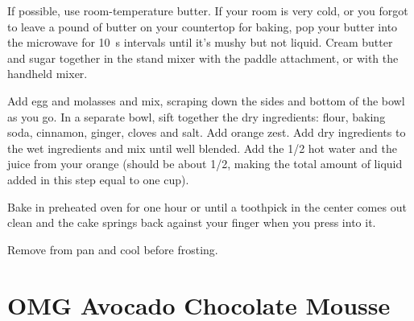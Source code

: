 If possible, use room-temperature butter. If your room is very cold, or you
forgot to leave a pound of butter on your countertop for baking, pop your butter
into the microwave for \SI{10}{\second} intervals until it's mushy but not
liquid. Cream butter and sugar together in the stand mixer with the paddle
attachment, or with the handheld mixer.

Add egg and molasses and mix, scraping down the sides and bottom of the bowl as
you go. In a separate bowl, sift together the dry ingredients: flour, baking
soda, cinnamon, ginger, cloves and salt. Add orange zest. Add dry ingredients to
the wet ingredients and mix until well blended. Add the \SI{1/2}{\cup} hot water
and the juice from your orange (should be about \SI{1/2}{\cup}, making the total
amount of liquid added in this step equal to one cup).

Bake in preheated oven for one hour or until a toothpick in the center comes out
clean and the cake springs back against your finger when you press into it.

Remove from pan and cool before frosting.

\section{OMG Avocado Chocolate Mousse}


